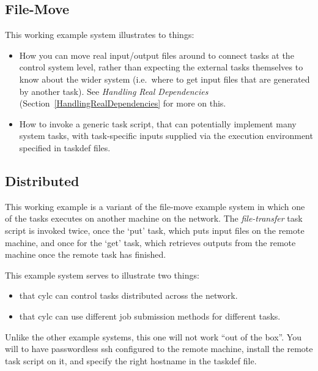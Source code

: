 \documentclass[11pt,a4paper]{article}
\begin{document}
\subsection{File-Move}

This working example system illustrates to things:

\begin{itemize}
    \item How you can move real input/output files around to connect
        tasks at the control system level, rather than expecting the
        external tasks themselves to know about the wider system (i.e.\
        where to get input files that are generated by another task).
        See {\em Handling Real Dependencies}
        (Section~\ref{HandlingRealDependencies} for more on this.

    \item How to invoke a generic task script, that can potentially
        implement many system tasks, with task-specific inputs supplied
        via the execution environment specified in taskdef files.

\end{itemize}

\subsection{Distributed}

This working example is a variant of the file-move example system in
which one of the tasks executes on another machine on the network. The
{\em file-transfer} task script is invoked twice, once the `put' task,
which puts input files on the remote machine, and once for the `get'
task, which retrieves outputs from the remote machine once the remote
task has finished.

This example system serves to illustrate two things:

\begin{itemize}
    \item that cylc can control tasks distributed across the network.
    \item that cylc can use different job submission methods for
        different tasks.
\end{itemize}

Unlike the other example systems, this one will not work ``out of the
box''. You will to have passwordless ssh configured to the remote
machine, install the remote task script on it, and specify the right
hostname in the taskdef file.
\end{document}
